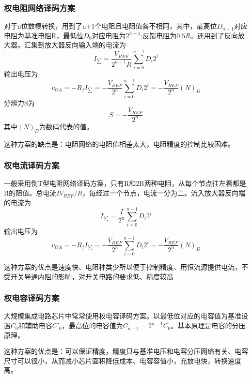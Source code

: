 \documentclass{ctexart}
\begin{document}
\subsubsection{权电阻网络译码方案}
对于n位数模转换，用到了n+1个电阻且电阻值各不相同，其中，最高位$D_{n-1}$对应电阻为基准电阻R，最低位$D_0$对应电阻为$2^{n-1}$;反馈电阻为$0.5R$。还用到了反向放大器。汇集到放大器反向输入端的电流为
\begin{equation}
    I_{\sum}=\dfrac{V_{REF}}{2^{n-1}R}\sum_{i=0}^{n-1}D_i 2^i
\end{equation}
输出电压为
\begin{equation}
    v_{OA}=-R_f I_{\sum}=-\dfrac{V_{REF}}{2^n}\sum_{i=0}^{n-1}D_i 2^i=-\dfrac{V_{REF}}{2^n}(N)_D
\end{equation}
分辨力S为
\begin{equation}
    S=-\dfrac{V_{REF}}{2^n}
\end{equation}
其中$(N)_D$为数码代表的值。{\color{red}{注意输出电压和分辨力都是负值！}}

这种方案的缺点是：电阻网络的电阻值相差太大，电阻精度的控制比较困难。
\subsubsection{权电流译码方案}
一般采用倒T型电阻网络译码方案，只有R和2R两种电阻，从每个节点往左看都是R的阻值。总电流$I
V_{REF}/R$，每经过一个节点，电流一分为二。流入放大器反向端的电流为
\begin{equation}
    I_{\sum}=\dfrac{I}{2^{n}}\sum_{i=0}^{n-1}D_i 2^i
\end{equation}
输出电压为
\begin{equation}
    v_{OA}=-R_f I_{\sum}=-\dfrac{V_{REF}}{2^n}\sum_{i=0}^{n-1}D_i 2^i=-\dfrac{V_{REF}}{2^n}(N)_D
\end{equation}
{\color{red}{注意输出电压和分辨力都是负值！但电流不是负值！}}

这种方案的优点是速度快、电阻种类少所以便于控制精度、用恒流源提供电流，不受开关导通内阻的影响，对开关电路的要求低、精度较高
\subsubsection{权电容译码方案}
大规模集成电路芯片中常常使用权电容译码方案。以最低位对应的电容值为基准设置$C_0$和辅助电容$C'_0$，最高位的电容值为$C_{n-1}=2^{n-1}C_0$。基本原理是电容的分压原理。

这种方案的优点是：可以保证精度，精度只与基准电压和电容分压网络有关、电容尺寸可以很小，从而减小芯片面积降低成本、电容容值小，充放电快，转换速度高。
\end{document}
